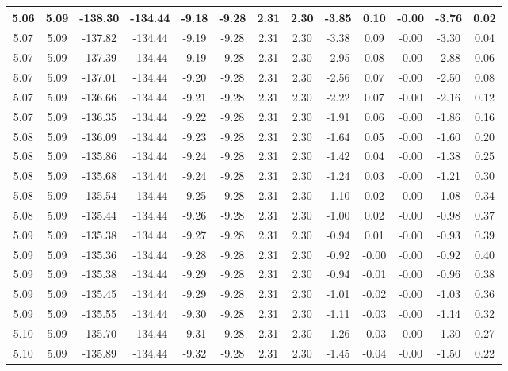 \begin{table}[htbp]
\begin{adjustbox}{angle=90}
\begin{tabular}{|c|c|c|c|c|c|c|c|c|c|c|c|c|}
 5.06 & 5.09 & -138.30 & -134.44 & -9.18 & -9.28 & 2.31 & 2.30 & -3.85 & 0.10 & -0.00 & -3.76 & 0.02\\ \hline
 5.07 & 5.09 & -137.82 & -134.44 & -9.19 & -9.28 & 2.31 & 2.30 & -3.38 & 0.09 & -0.00 & -3.30 & 0.04\\ \hline
 5.07 & 5.09 & -137.39 & -134.44 & -9.19 & -9.28 & 2.31 & 2.30 & -2.95 & 0.08 & -0.00 & -2.88 & 0.06\\ \hline
 5.07 & 5.09 & -137.01 & -134.44 & -9.20 & -9.28 & 2.31 & 2.30 & -2.56 & 0.07 & -0.00 & -2.50 & 0.08\\ \hline
 5.07 & 5.09 & -136.66 & -134.44 & -9.21 & -9.28 & 2.31 & 2.30 & -2.22 & 0.07 & -0.00 & -2.16 & 0.12\\ \hline
 5.07 & 5.09 & -136.35 & -134.44 & -9.22 & -9.28 & 2.31 & 2.30 & -1.91 & 0.06 & -0.00 & -1.86 & 0.16\\ \hline
 5.08 & 5.09 & -136.09 & -134.44 & -9.23 & -9.28 & 2.31 & 2.30 & -1.64 & 0.05 & -0.00 & -1.60 & 0.20\\ \hline
 5.08 & 5.09 & -135.86 & -134.44 & -9.24 & -9.28 & 2.31 & 2.30 & -1.42 & 0.04 & -0.00 & -1.38 & 0.25\\ \hline
 5.08 & 5.09 & -135.68 & -134.44 & -9.24 & -9.28 & 2.31 & 2.30 & -1.24 & 0.03 & -0.00 & -1.21 & 0.30\\ \hline
 5.08 & 5.09 & -135.54 & -134.44 & -9.25 & -9.28 & 2.31 & 2.30 & -1.10 & 0.02 & -0.00 & -1.08 & 0.34\\ \hline
 5.08 & 5.09 & -135.44 & -134.44 & -9.26 & -9.28 & 2.31 & 2.30 & -1.00 & 0.02 & -0.00 & -0.98 & 0.37\\ \hline
 5.09 & 5.09 & -135.38 & -134.44 & -9.27 & -9.28 & 2.31 & 2.30 & -0.94 & 0.01 & -0.00 & -0.93 & 0.39\\ \hline
 5.09 & 5.09 & -135.36 & -134.44 & -9.28 & -9.28 & 2.31 & 2.30 & -0.92 & -0.00 & -0.00 & -0.92 & 0.40\\ \hline
 5.09 & 5.09 & -135.38 & -134.44 & -9.29 & -9.28 & 2.31 & 2.30 & -0.94 & -0.01 & -0.00 & -0.96 & 0.38\\ \hline
 5.09 & 5.09 & -135.45 & -134.44 & -9.29 & -9.28 & 2.31 & 2.30 & -1.01 & -0.02 & -0.00 & -1.03 & 0.36\\ \hline
 5.09 & 5.09 & -135.55 & -134.44 & -9.30 & -9.28 & 2.31 & 2.30 & -1.11 & -0.03 & -0.00 & -1.14 & 0.32\\ \hline
 5.10 & 5.09 & -135.70 & -134.44 & -9.31 & -9.28 & 2.31 & 2.30 & -1.26 & -0.03 & -0.00 & -1.30 & 0.27\\ \hline
 5.10 & 5.09 & -135.89 & -134.44 & -9.32 & -9.28 & 2.31 & 2.30 & -1.45 & -0.04 & -0.00 & -1.50 & 0.22\\ \hline

\end{tabular}
\end{adjustbox}
\end{table}
